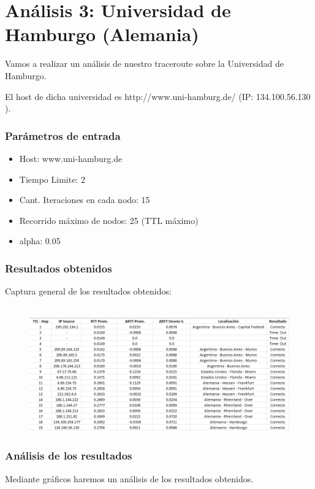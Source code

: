 \section{An\'alisis 3: Universidad de Hamburgo (Alemania)}
Vamos a realizar un an\'alisis de nuestro traceroute sobre la Universidad de Hamburgo.

El host de dicha universidad es http://www.uni-hamburg.de/ (IP: 134.100.56.130 ).\\	


\subsubsection{Par\'ametros de entrada}
\begin{itemize}
\item Host: www.uni-hamburg.de
\item Tiempo Limite: 2
\item Cant. Iteraciones en cada nodo: 15
\item Recorrido m\'aximo de nodos: 25 (TTL m\'aximo)
\item alpha: 0.05
\end{itemize}

\subsubsection{Resultados obtenidos}

Captura general de los resultados obtenidos: 
\\
\\
\begin{figure}[h]
	\begin{center}
    \includegraphics[width=1\textwidth]{img_analisis3/captura.png} 
	\end{center} 
\end{figure}

\subsubsection{An\'alisis de los resultados}
Mediante gr\'aficos haremos un an\'alisis de los resultados obtenidos. \newline


